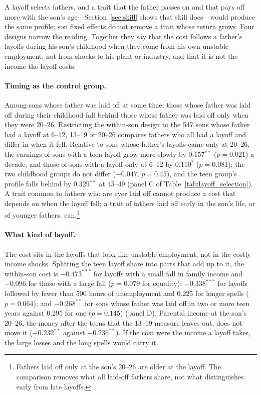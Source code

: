 A layoff selects fathers, and a trait that the father passes on and that pays off more with the son's age---Section~\ref{sec:skill}
shows that skill does---would produce the same profile; son fixed effects do not remove a trait whose return grows.
Four designs narrow the reading. Together they say that the cost follows a father's layoffs during his son's childhood
when they come from his own unstable employment, not from shocks to his plant or industry, and that it is not the
income the layoff costs.

\paragraph{Timing as the control group.} Among sons whose father was laid off at some time, those whose father was laid
off during their childhood fall behind those whose father was laid off only when they were 20--26. Restricting the
within-son design to the 547 sons whose father had a layoff at 6--12, 13--19 or 20--26 compares fathers who all had a
layoff and differ in when it fell. Relative to sons whose father's layoffs came only at 20--26, the earnings of sons
with a teen layoff grow more slowly by 0.157$^{**}$ ($p = 0.021$) a decade, and those of sons with a layoff only at
6--12 by 0.110$^{*}$ ($p = 0.081$); the two childhood groups do not differ ($-0.047$, $p = 0.45$), and the teen group's
profile falls behind by 0.329$^{**}$ at 45--49 (panel C of Table~\ref{tab:layoff_selection}). A trait common to fathers
who are ever laid off cannot produce a cost that depends on when the layoff fell; a trait of fathers laid off early in
the son's life, or of younger fathers, can.\footnote{Fathers laid off only at the son's 20--26 are older at the layoff.
The comparison removes what all laid-off fathers share, not what distinguishes early from late layoffs.}

\paragraph{What kind of layoff.} The cost sits in the layoffs that look like unstable employment, not in the costly
income shocks. Splitting the teen layoff share into parts that add up to it, the within-son cost is $-0.473^{***}$ for
layoffs with a small fall in family income and $-0.096$ for those with a large fall ($p = 0.079$ for equality);
$-0.338^{***}$ for layoffs followed by fewer than 500 hours of unemployment and 0.225 for longer spells ($p = 0.064$);
and $-0.268^{**}$ for sons whose father was laid off in two or more teen years against 0.295 for one ($p = 0.145$)
(panel D). Parental income at the son's 20--26, the money after the teens that the 13--19 measure leaves out, does not
move it ($-0.232^{**}$ against $-0.236^{**}$). If the cost were the income a layoff takes, the large losses and the long
spells would carry it.

